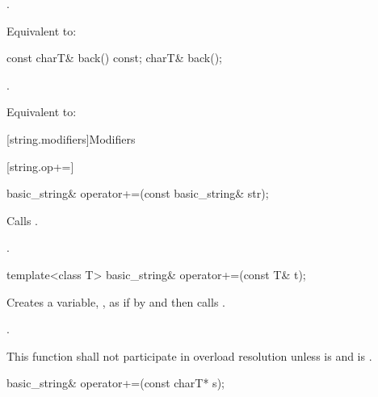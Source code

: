 \begin{itemdescr}
\pnum
\requires
{}.

\pnum
\effects
Equivalent to: 
\end{itemdescr}

%
\begin{itemdecl}
const charT& back() const;
charT& back();
\end{itemdecl}

\begin{itemdescr}
\pnum
\requires
{}.

\pnum
\effects
Equivalent to: 
\end{itemdescr}

[string.modifiers]{Modifiers}

[string.op+=]{}

%
\begin{itemdecl}
basic_string& operator+=(const basic_string& str);
\end{itemdecl}

\begin{itemdescr}
\pnum
\effects Calls .

\pnum
\returns
{}.
\end{itemdescr}

%
\begin{itemdecl}
template<class T>
  basic_string& operator+=(const T& t);
\end{itemdecl}

\begin{itemdescr}
\pnum
\effects
Creates a variable, , as if by
 and
then calls .

\pnum
\returns
{}.

\pnum
\remarks
This function shall not participate in overload resolution unless
 is  and
 is .
\end{itemdescr}

%
\begin{itemdecl}
basic_string& operator+=(const charT* s);
\end{itemdecl}

